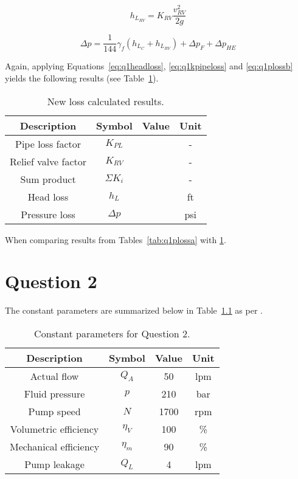 \begin{equation}
	\label{eq:q1hlrv}	
	h_{L_{RV}} = K_{RV} \frac{v_{RV}^2}{2g} 
\end{equation}


\begin{equation}
	\label{eq:q1plossb}	
	\Delta p = \frac{1}{144}\gamma_f \left( h_{L_C} + h_{L_{RV}} \right) + \Delta p_F + \Delta p_{HE} 
\end{equation}

Again, applying Equations~\ref{eq:q1headloss}, \ref{eq:q1kpipeloss} and \ref{eq:q1plossb} yields the following results (see Table~\ref{tab:q1plossb}).


\begin{table}[H]
  \centering
  \caption{New loss calculated results.}
    \begin{tabular}{cccc}
    \toprule
    \textbf{Description} & \textbf{Symbol} & \textbf{Value } & \textbf{Unit} \\
    \midrule
    Pipe loss factor & $K_{PL}$ &  & - \\
    Relief valve factor & $K_{RV}$   & & - \\
    Sum product  & $\Sigma K_i$   &  & - \\
    Head loss & $h_L$ &  & ft \\
    Pressure loss & $\Delta p$ &  & psi \\
    \bottomrule
    \end{tabular}
  \label{tab:q1plossb}
\end{table}

When comparing results from Tables~\ref{tab:q1plossa} with \ref{tab:q1plossb}.

\chapter{Question 2}
\label{chap:q2}

The constant parameters are summarized below in Table~\ref{tab:q2param} as per \cite{assign}.

\begin{table}[H]
  \centering
  \caption{Constant parameters for Question 2.}
    \begin{tabular}{cccc}
    \toprule
    \textbf{Description} & \textbf{Symbol} & \textbf{Value } & \textbf{Unit} \\
    \midrule
    Actual flow & $Q_A$     & 50    & lpm \\
    Fluid pressure & $p$     & 210   & bar \\
    Pump speed & $N$     & 1700  & rpm \\
	Volumetric efficiency & $\eta_V$     & 100  & \% \\
	Mechanical efficiency & $\eta_m$     & 90  & \% \\
	Pump leakage & $Q_L$     & 4  & lpm \\
    \bottomrule
    \end{tabular}
  \label{tab:q2param}
\end{table}

